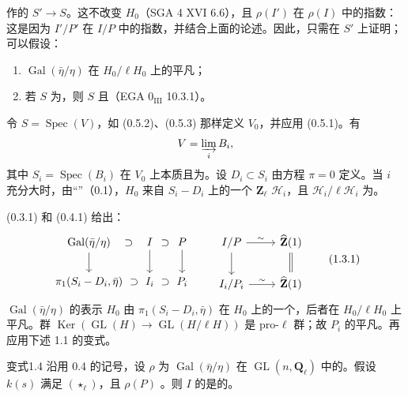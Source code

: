 作的 $S'\to S$。这不改变 $H_0$（SGA 4 XVI 6.6），且 $\rho(I')$ 在 $\rho(I)$ 中的指数：这是因为 $I'/P'$ 在 $I/P$ 中的指数，并结合上面的论述。因此，只需在 $S'$ 上证明；可以假设：
\begin{enumerate}
\item[a)] $\operatorname{Gal}(\bar\eta/\eta)$ 在 $H_0/\ell H_0$ 上的平凡；
\item[b)] 若 $S$ 为，则 $S$ 且（EGA $0_{\mathrm{III}}$ 10.3.1）。
\end{enumerate}
令 $S=\operatorname{Spec}(V)$，如 (0.5.2)、(0.5.3) 那样定义 $V_0$，并应用 (0.5.1)。有
\[
V=\varinjlim_i B_i,
\]
其中 $S_i=\operatorname{Spec}(B_i)$ 在 $V_0$ 上本质且为。设 $D_i\subset S_i$ 由方程 $\pi=0$ 定义。当 $i$ 充分大时，由“”（0.1），$H_0$ 来自 $S_i-D_i$ 上的一个 $\mathbf Z_\ell$  $\mathscr H_i$，且 $\mathscr H_i/\ell\mathscr H_i$ 为。

 (0.3.1) 和 (0.4.1) 给出：
\[
\begin{tikzcd}[column sep=small]
\operatorname{Gal}(\bar\eta/\eta)\arrow[d]\arrow[r,phantom,"\supset"]&I\arrow[d]\arrow[r,phantom,"\supset"]&P\arrow[d]\\
\pi_1(S_i-D_i,\bar\eta)\arrow[r,phantom,"\supset"]&I_i\arrow[r,phantom,"\supset"]&P_i
\end{tikzcd}
\qquad
\begin{tikzcd}
I/P\arrow[d]\arrow[r,"\sim"]&\widehat{\mathbf Z}(1)\arrow[d,equal]\\
I_i/P_i\arrow[r,"\sim"]&\widehat{\mathbf Z}(1)
\end{tikzcd}\tag{1.3.1}
\]
$\operatorname{Gal}(\bar\eta/\eta)$ 的表示 $H_0$ 由 $\pi_1(S_i-D_i,\bar\eta)$ 在 $H_0$ 上的一个，后者在 $H_0/\ell H_0$ 上平凡。群 $\operatorname{Ker}(\operatorname{GL}(H)\to\operatorname{GL}(H/\ell H))$ 是 pro-$\ell$ 群；故 $P_i$ 的平凡。再应用下述 1.1 的变式。

\begin{SGAresult}{变式}{1.4}
沿用 0.4 的记号，设 $\rho$ 为 $\operatorname{Gal}(\bar\eta/\eta)$ 在 $\operatorname{GL}(n,\mathbf Q_\ell)$ 中的。假设 $k(s)$ 满足 $(\star_\ell)$，且 $\rho(P)$ 。则 $I$ 的是的。
\end{SGAresult}

